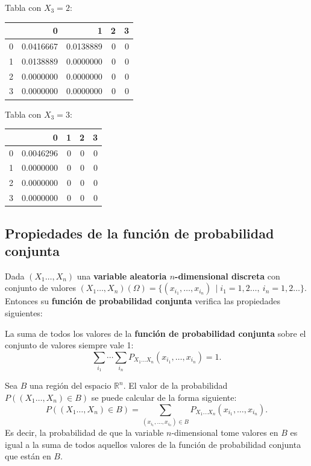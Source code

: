 \documentclass[]{book}
\begin{document}
Tabla con \(X_3=2\):

\begin{tabular}{l|r|r|r|r}
\hline
  & 0 & 1 & 2 & 3\\
\hline
0 & 0.0416667 & 0.0138889 & 0 & 0\\
\hline
1 & 0.0138889 & 0.0000000 & 0 & 0\\
\hline
2 & 0.0000000 & 0.0000000 & 0 & 0\\
\hline
3 & 0.0000000 & 0.0000000 & 0 & 0\\
\hline
\end{tabular}

Tabla con \(X_3=3\):

\begin{tabular}{l|r|r|r|r}
\hline
  & 0 & 1 & 2 & 3\\
\hline
0 & 0.0046296 & 0 & 0 & 0\\
\hline
1 & 0.0000000 & 0 & 0 & 0\\
\hline
2 & 0.0000000 & 0 & 0 & 0\\
\hline
3 & 0.0000000 & 0 & 0 & 0\\
\hline
\end{tabular}

\hypertarget{propiedades-de-la-funciuxf3n-de-probabilidad-conjunta-1}{%
\subsection{Propiedades de la función de probabilidad conjunta}\label{propiedades-de-la-funciuxf3n-de-probabilidad-conjunta-1}}

Dada \((X_1\ldots,X_n)\) una \textbf{variable aleatoria \(n\)-dimensional discreta} con conjunto de valores \((X_1\ldots,X_n)(\Omega)=\{(x_{i_1},\ldots,x_{i_n})\, \mid i_1=1,2\ldots,\ i_n=1,2\ldots\}\). Entonces su \textbf{función de probabilidad conjunta} verifica las propiedades siguientes:

La suma de todos los valores de la \textbf{función de probabilidad conjunta} sobre el conjunto de valores siempre vale 1: \[\sum_{i_1}\cdots\sum_{i_n} P_{X_1\ldots X_n}(x_{i_1},\ldots,x_{i_n})=1.\]

Sea \(B\) una región del espacio \(\mathbb{R}^n\). El valor de la probabilidad \(P((X_1\ldots,X_n)\in B)\) se puede calcular de la forma siguiente:
\[
P((X_1\ldots,X_n)\in B) =\sum_{(x_{i_1},\ldots,x_{i_n})\in B} P_{X_1\ldots X_n}(x_{i_1},\ldots,x_{i_n}).
\]
Es decir, la probabilidad de que la variable \(n\)-dimensional tome valores en \(B\) es igual a la suma de todos aquellos valores de la función de probabilidad conjunta que están en \(B\).
\end{document}
